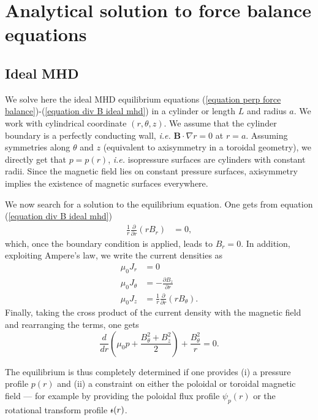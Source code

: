 \appendix
\chapter{Analytical solution to force balance equations}

\section{Ideal MHD}
\label{appendix jxb=grad p solution}
We solve here the ideal MHD equilibrium equations (\ref{equation perp force balance})-(\ref{equation div B ideal mhd}) in a cylinder or length $L$ and radius $a$. We work with cylindrical coordinate $(r,\theta,z)$. We assume that the cylinder boundary is a perfectly conducting wall, \textit{i.e.} $\mathbf{B}\cdot\nabla r=0$ at $r=a$. Assuming symmetries along $\theta$ and $z$ (equivalent to axisymmetry in a toroidal geometry), we directly get that $p=p(r)$, \textit{i.e.} isopressure surfaces are cylinders with constant radii. Since the magnetic field lies on constant pressure surfaces, axisymmetry implies the existence of magnetic surfaces everywhere.

We now search for a solution to the equilibrium equation. One gets from equation (\ref{equation div B ideal mhd})
\begin{align}
\frac{1}{r}\frac{\partial}{\partial r}(r B_r) &= 0, 
\end{align}
which, once the boundary condition is applied, leads to $B_r=0$. In addition, exploiting Ampere's law, we write the current densities as
\begin{align}
	\mu_0J_r &= 0\\
	\mu_0J_\theta &= -\frac{\partial B_z}{\partial r}\\
	\mu_0J_z &= \frac{1}{r}\frac{\partial}{\partial r}(rB_\theta).
\end{align} 
Finally, taking the cross product of the current density with the magnetic field and rearranging the terms, one gets
\begin{equation}
	\frac{d}{dr}\left(\mu_0p + \frac{B_\theta^2 + B_z^2}{2}\right) + \frac{B_\theta^2}{r} = 0.
\end{equation}

The equilibrium is thus completely determined if one provides (i) a pressure profile $p(r)$ and (ii) a constraint on either the poloidal or toroidal magnetic field --- for example by providing the poloidal flux profile $\psi_p(r)$ or the rotational transform profile $\text{$\iota\!\!$-}(r)$.



